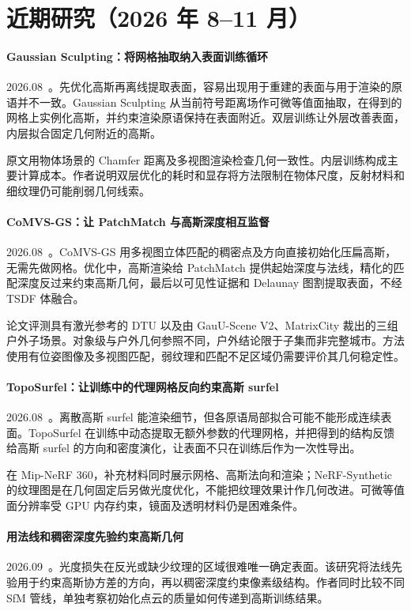 \section{近期研究（2026 年 8--11 月）}
\paragraph{Gaussian Sculpting：将网格抽取纳入表面训练循环}
2026.08~\cite{2608_10602}。先优化高斯再离线提取表面，容易出现用于重建的表面与用于渲染的原语并不一致。Gaussian Sculpting 从当前符号距离场作可微等值面抽取，在得到的网格上实例化高斯，并约束渲染原语保持在表面附近。双层训练让外层改善表面，内层拟合固定几何附近的高斯。

原文用物体场景的 Chamfer 距离及多视图渲染检查几何一致性。内层训练构成主要计算成本。作者说明双层优化的耗时和显存将方法限制在物体尺度，反射材料和细纹理仍可能削弱几何线索。

\paragraph{CoMVS-GS：让 PatchMatch 与高斯深度相互监督}
2026.08~\cite{2608_18413}。CoMVS-GS 用多视图立体匹配的稠密点及方向直接初始化压扁高斯，无需先做网格。优化中，高斯渲染给 PatchMatch 提供起始深度与法线，精化的匹配深度反过来约束高斯几何，最后以可见性证据和 Delaunay 图割提取表面，不经 TSDF 体融合。

论文评测具有激光参考的 DTU 以及由 GauU-Scene V2、MatrixCity 裁出的三组户外子场景。对象级与户外几何参照不同，户外结论限于子集而非完整城市。方法使用有位姿图像及多视图匹配，弱纹理和匹配不足区域仍需要评价其几何稳定性。

\paragraph{TopoSurfel：让训练中的代理网格反向约束高斯 surfel}
2026.08~\cite{2608_20687}。离散高斯 surfel 能渲染细节，但各原语局部拟合可能不能形成连续表面。TopoSurfel 在训练中动态提取无额外参数的代理网格，并把得到的结构反馈给高斯 surfel 的方向和密度演化，让表面不只在训练后作为一次性导出。

在 Mip-NeRF 360，补充材料同时展示网格、高斯法向和渲染；NeRF-Synthetic 的纹理图是在几何固定后另做光度优化，不能把纹理效果计作几何改进。可微等值面分辨率受 GPU 内存约束，镜面及透明材料仍是困难条件。

\paragraph{用法线和稠密深度先验约束高斯几何}
2026.09~\cite{2609_36969}。光度损失在反光或缺少纹理的区域很难唯一确定表面。该研究将法线先验用于约束高斯协方差的方向，再以稠密深度约束像素级结构。作者同时比较不同 SfM 管线，单独考察初始化点云的质量如何传递到高斯训练结果。

